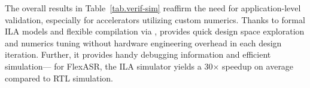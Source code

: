 
The overall results in Table~\ref{tab.verif-sim} reaffirm the need for application-level validation, especially for accelerators utilizing custom numerics.
%
%
%
Thanks to formal ILA models
  and flexible compilation via \g, 
  \TLA provides quick design space exploration and numerics tuning without hardware engineering overhead %
in each design iteration.
%
%
Further, it provides handy debugging information and efficient simulation---%
%
for FlexASR, the ILA simulator yields a 30$\times$ speedup on average compared to RTL simulation.

